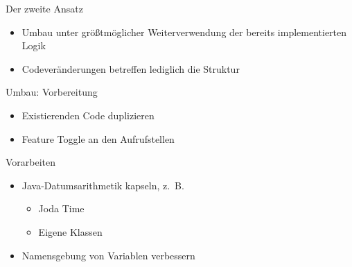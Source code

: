 %
%
%
%

\begin{frame}[t,fragile]{Der zweite Ansatz}
\begin{itemize}
\item Umbau unter größtmöglicher Weiterverwendung der bereits implementierten Logik
\item Codeveränderungen betreffen lediglich die Struktur
\end{itemize}
\end{frame}

\begin{frame}[t,fragile]{Umbau: Vorbereitung}
\begin{itemize}
\item Existierenden Code duplizieren
\item Feature Toggle an den Aufrufstellen
\end{itemize}
\end{frame}
 
\begin{frame}[t,fragile]{Vorarbeiten}
\begin{itemize}
\item Java-Datumsarithmetik kapseln, z.~B.
\begin{itemize}
\item Joda Time
\item Eigene Klassen
\end{itemize}
\item Namensgebung von Variablen verbessern
\end{itemize}
\end{frame}

